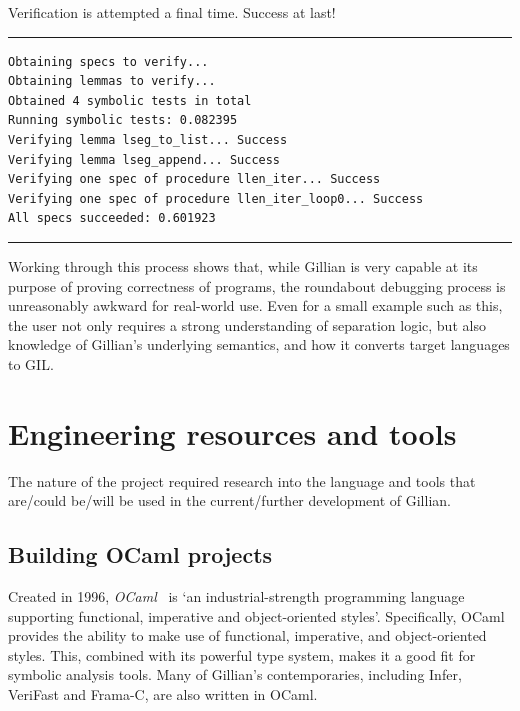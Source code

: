 Verification is attempted a final time. Success at last!

\noindent\rule{\textwidth}{0.5pt}
\vspace{-0.6cm}
\begin{verbatim}
Obtaining specs to verify...
Obtaining lemmas to verify...
Obtained 4 symbolic tests in total
Running symbolic tests: 0.082395
Verifying lemma lseg_to_list... Success
Verifying lemma lseg_append... Success
Verifying one spec of procedure llen_iter... Success
Verifying one spec of procedure llen_iter_loop0... Success
All specs succeeded: 0.601923
\end{verbatim}
\vspace{-0.4cm}
\noindent\rule{\textwidth}{0.5pt}
\vspace{-0.6cm}
\vspace{0.5cm}

Working through this process shows that, while Gillian is very capable at its
purpose of proving correctness of programs, the roundabout debugging process is
unreasonably awkward for real-world use. Even for a small example such as this,
the user not only requires a strong understanding of separation logic, but also
knowledge of Gillian's underlying semantics, and how it converts target
languages to GIL.\@

\section{Engineering resources and tools}\label{sec:background:engineering-tools}

The nature of the project required research into the language and tools that
are/could be/will be used in the current/further development of Gillian.

\subsection{Building OCaml projects}

Created in 1996, \textit{OCaml}~\cite{ocaml} is `an industrial-strength
programming language supporting functional, imperative and object-oriented
styles'. Specifically, OCaml provides the ability to make use of functional,
imperative, and object-oriented styles. This, combined with its powerful type
system, makes it a good fit for symbolic analysis tools. Many of Gillian's
contemporaries, including Infer, VeriFast and Frama-C, are also written in
OCaml.

